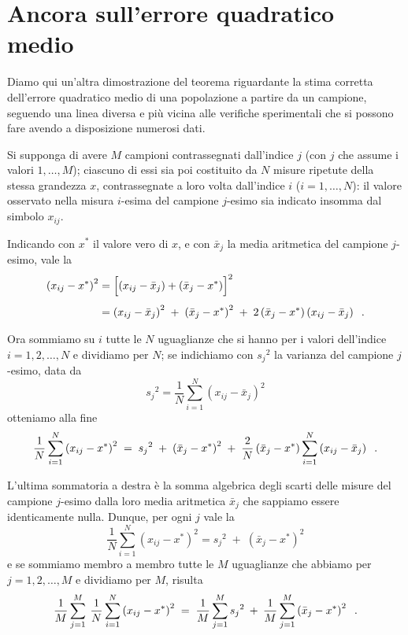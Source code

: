 \section{Ancora sull'errore quadratico medio}
Diamo qui un'altra dimostrazione del teorema riguardante la
stima corretta dell'errore quadratico medio di una
popolazione a partire da un campione, seguendo una linea
diversa e pi\`u vicina alle verifiche sperimentali che si
possono fare avendo a disposizione numerosi dati.

Si supponga di avere $M$ campioni contrassegnati dall'indice
$j$ (con $j$ che assume i valori $1,\ldots,M$); ciascuno di
essi sia poi costituito da $N$ misure ripetute della stessa
grandezza $x$, contrassegnate a loro volta dall'indice $i$
($i=1,\ldots,N$): il valore osservato nella misura $i$-esima
del campione $j$-esimo sia indicato insomma dal simbolo
$x_{ij}$.

Indicando con $x^{*}$ il valore vero di $x$, e con $\bar
x_{j}$ la media aritmetica del campione $j$-esimo, vale la
\begin{align*}
  \left( x_{ij} - x^* \right) ^2 &= \Bigl[
    \left( x_{ij} - \bar x_j \right) + \left(
    \bar x_j - x^* \right) \Bigr] ^2 \\[1ex]
  &= \left( x_{ij} - \bar x_j \right) ^2 \; + \;
    \left( \bar x_j - x^* \right) ^2 \; + \;
    2 \left( \bar x_j - x^* \right) \left( x_{ij}
    - \bar x_j \right) \;\; .
\end{align*}

Ora sommiamo su $i$ tutte le $N$ uguaglianze che si hanno
per i valori dell'indice $i=1,2,\ldots,N$ e dividiamo per
$N$; se indichiamo con $ {s_j}^2 $ la varianza del campione
$j$-esimo, data da
\begin{equation*}
  {s_j}^2 = \frac{1}{N} \sum_{i=1}^{N}
  \left( x_{ij} - \bar x_{j} \right) ^{2}
\end{equation*}
otteniamo alla fine
\begin{equation*}
  \frac{1}{N} \sum_{i=1}^N \left( x_{ij} - x^* \right) ^2 \;
  = \; {s_j}^2 \; + \; \left( \bar x_j - x^* \right) ^2 \; +
  \; \frac{2}{N} \left( \bar x_j - x^* \right)
  \sum_{i=1}^N \left( x_{ij} - \bar x_j \right) \;\; .
\end{equation*}

L'ultima sommatoria a destra \`e la somma algebrica degli
scarti delle misure del campione $j$-esimo dalla loro media
aritmetica $\bar x_j$ che sappiamo essere identicamente
nulla. Dunque, per ogni $j$ vale la
\begin{equation*}
  \frac{1}{N} \sum_{i=1}^N \left( x_{ij} - x^* \right) ^2 =
  {s_j}^2 \; + \; \left( \bar x_j - x^* \right) ^2
\end{equation*}
e se sommiamo membro a membro tutte le $M$ uguaglianze che
abbiamo per $j=1,2,\ldots,M$ e dividiamo per $M$, risulta
\begin{equation*}
  \frac{1}{M} \sum_{j=1}^M \: \frac{1}{N} \sum_{i=1}^N
  \left( x_{ij} - x^* \right) ^2 \; = \; \frac{1}{M}
  \sum_{j=1}^M {s_j}^2 \: + \: \frac{1}{M} \sum_{j=1}^M
  \left( \bar x_j - x^* \right) ^2 \;\; .
\end{equation*}

